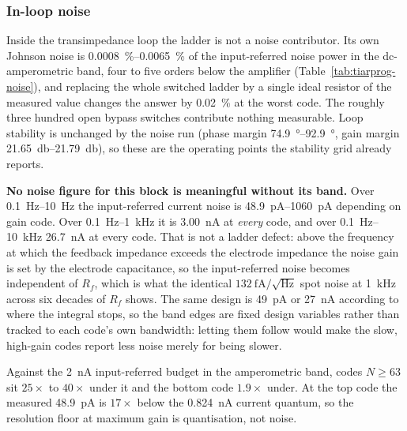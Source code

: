 \subsubsection{In-loop noise}\label{sss:tiarprog-noise}

Inside the transimpedance loop the ladder is not a noise contributor. Its own
Johnson noise is \SIrange{0.0008}{0.0065}{\percent} of the input-referred noise
power in the dc-amperometric band, four to five orders below the amplifier
(Table~\ref{tab:tiarprog-noise}), and replacing the whole switched ladder by a
single ideal resistor of the measured value changes the answer by
\SI{0.02}{\percent} at the worst code. The roughly three hundred open bypass
switches contribute nothing measurable. Loop stability is unchanged by the noise
run (phase margin \SIrange{74.9}{92.9}{\degree}, gain margin
\SIrange{21.65}{21.79}{\decibel}), so these are the operating points the
stability grid already reports.

\textbf{No noise figure for this block is meaningful without its band.} Over
\SIrange{0.1}{10}{\hertz} the input-referred current noise is
\SIrange{48.9}{1060}{\pico\ampere} depending on gain code. Over
\SI{0.1}{\hertz}--\SI{1}{\kilo\hertz} it is \SI{3.00}{\nano\ampere} at
\emph{every} code, and over \SI{0.1}{\hertz}--\SI{10}{\kilo\hertz}
\SI{26.7}{\nano\ampere} at every code. That is not a ladder defect: above the frequency at which the feedback
impedance exceeds the electrode impedance the noise gain is set by the electrode
capacitance, so the input-referred noise becomes independent of \(R_f\), which
is what the identical \(\SI{132}{\femto\ampere}/\sqrt{\si{\hertz}}\) spot
noise at \SI{1}{\kilo\hertz} across six decades of \(R_f\) shows. The same design is
\SI{49}{\pico\ampere} or \SI{27}{\nano\ampere} according to where the integral
stops, so the band edges are fixed design variables rather than tracked to each
code's own bandwidth: letting them follow would make the slow, high-gain
codes report less noise merely for being slower.

Against the \SI{2}{\nano\ampere} input-referred budget in the amperometric band,
codes \(N \ge 63\) sit \(25\times\) to \(40\times\) under it and the bottom code
\(1.9\times\) under. At the top code the measured \SI{48.9}{\pico\ampere} is
\(17\times\) below the \SI{0.824}{\nano\ampere} current quantum, so the
resolution floor at maximum gain is quantisation, not noise.

